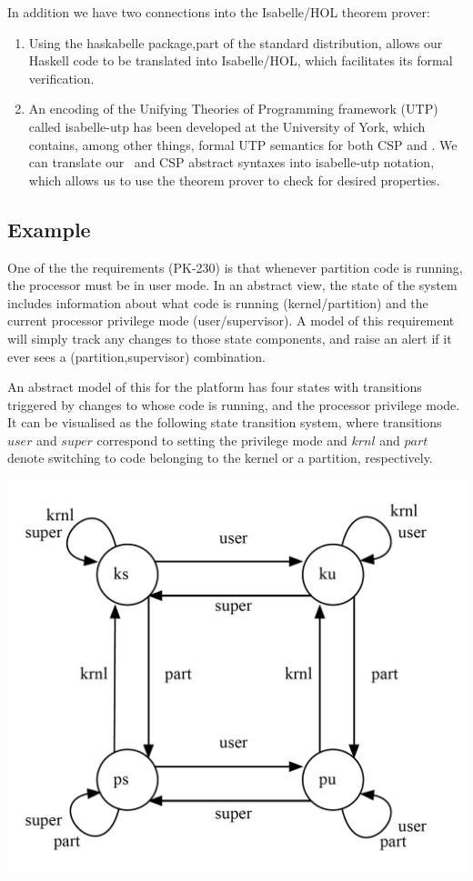 In addition we have two connections into
the Isabelle/HOL theorem prover:
\begin{enumerate}
  \item
    Using the \textsf{haskabelle} package,part of the standard distribution,
    allows our Haskell code to be translated into Isabelle/HOL,
    which facilitates its formal verification.
  \item
    An encoding of
    the Unifying Theories of Programming framework (UTP)
    called \textsf{isabelle-utp} has been developed
    at the University of York\cite{FosterZW14},
    which contains, among other things, formal UTP semantics for both CSP and
    \Circus.
    We can translate our \Circus\ and CSP abstract syntaxes into
    \textsf{isabelle-utp} notation,
    which allows us to use the theorem prover to check for desired properties.
\end{enumerate}

\subsection{Example}

One of the the requirements (PK-230) is that whenever partition code is running,
the processor must be in user mode.
In an abstract view,
the state of the system includes information about
what code is running (kernel/partition)
and the current processor privilege mode (user/supervisor).
A model of this requirement will simply track any changes
to those state components,
and raise an alert if it ever sees a (partition,supervisor) combination.

An abstract model of this for the platform
has four states with transitions triggered
by changes to whose code is running, and the processor privilege mode.
It can be visualised as the following state transition system,
where transitions $user$ and $super$ correspond to setting the privilege mode
and $krnl$ and $part$ denote switching to code belonging to the kernel or
a partition, respectively.

\includegraphics[scale=0.35]{images/CodeModelLTS}

